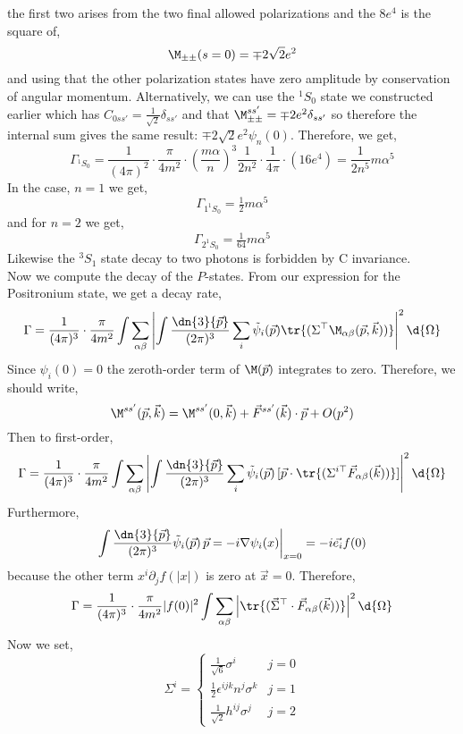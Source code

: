 \documentclass[12pt]{article}
\begin{document}
the first two arises from the two final allowed polarizations and the $8e^4$ is the square of,
\[ \M_{\pm \pm}(s = 0) = \mp 2 \sqrt{2} e^2 \]
and using that the other polarization states have zero amplitude by conservation of angular momentum. Alternatively, we can use the ${}^1 S_0$ state we constructed earlier which has $C_{0ss'} = \frac{1}{\sqrt{2}} \delta_{ss'}$ and that $\M^{ss'}_{\pm \pm} = \mp 2 e^2 \delta_{s s'}$ so therefore the internal sum gives the same result: $\mp 2 \sqrt{2} e^2 \psi_n(0)$.  Therefore, we get,
\[ \Gamma_{{}^1 S_0} = \frac{1}{(4 \pi)^2} \cdot \frac{\pi}{4 m^2} \cdot \left( \frac{m \alpha}{n} \right)^3 \frac{1}{2n^2} \cdot \frac{1}{4 \pi} \cdot (16 e^4) = \frac{1}{2 n^5} m \alpha^5 \]
In the case, $n = 1$ we get,
\[ \Gamma_{1^1 S_0} = \tfrac{1}{2} m \alpha^5 \]
and for $n = 2$ we get,
\[ \Gamma_{2^1 S_0} = \tfrac{1}{64} m \alpha^5 \]
Likewise the ${}^3 S_1$ state decay to two photons is forbidden by C invariance. 
\bigskip\\
Now we compute the decay of the $P$-states. From our expression for the Positronium state, we get a decay rate, 
\[ \Gamma = \frac{1}{(4 \pi)^3} \cdot \frac{\pi}{4 m^2} \int \sum_{\alpha \beta} \left| \int \frac{\dn{3}{\vec{p}}}{(2 \pi)^3} \sum_i \tilde{\psi}_i(\vec{p}) \tr{(\Sigma^\top \M_{\alpha \beta}(\vec{p}, \vec{k}))} \right|^2 \d{\Omega} \]
Since $\psi_i(0) = 0$ the zeroth-order term of $\M(\vec{p})$ integrates to zero. Therefore, we should write,
\[ \M^{ss'}(\vec{p},\vec{k}) = \M^{ss'}(0, \vec{k}) + \vec{F}^{ss'}(\vec{k}) \cdot \vec{p} + O(p^2) \]
Then to first-order,
\[ \Gamma = \frac{1}{(4 \pi)^3} \cdot \frac{\pi}{4 m^2} \int \sum_{\alpha \beta} \left| \int \frac{\dn{3}{\vec{p}}}{(2 \pi)^3} \sum_i \tilde{\psi}_i(\vec{p}) \, [\vec{p} \cdot \tr{(\Sigma^{i \top} \vec{F}_{\alpha \beta}(\vec{k}))}] \right|^2 \d{\Omega} \]
Furthermore,
\[ \int  \frac{\dn{3}{\vec{p}}}{(2 \pi)^3} \tilde{\psi}_i(\vec{p}) \, \vec{p} = - i \nabla \psi_i(x) \bigg|_{x = 0} = - i \vec{e_i} f(0) \]
because the other term $x^i \partial_j f(|x|)$ is zero at $\vec{x} = 0$. Therefore, 
\[ \Gamma = \frac{1}{(4 \pi)^3} \cdot \frac{\pi}{4 m^2} |f(0)|^2 \int \sum_{\alpha \beta} \left| \tr{(\vec{\Sigma}^{\top} \cdot \vec{F}_{\alpha \beta}(\vec{k}))} \right|^2 \d{\Omega} \]
Now we set,
\[ \Sigma^i = 
\begin{cases}
\frac{1}{\sqrt{6}} \sigma^i & j = 0
\\
\frac{1}{2} \epsilon^{ijk} n^j \sigma^k & j = 1
\\
\tfrac{1}{\sqrt{2}} h^{ij} \sigma^j & j = 2
\end{cases} \]
\end{document}

